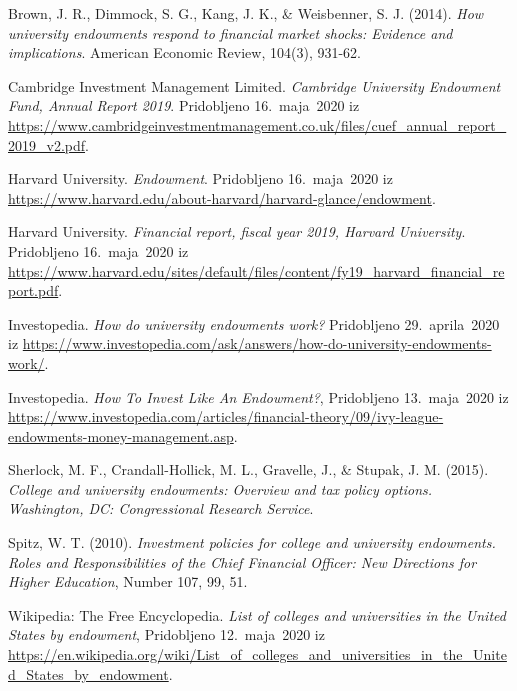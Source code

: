 \documentclass[12pt, a4paper]{article}
\begin{document}
\newpage
\begin{thebibliography}{99}

Brown, J. R., Dimmock, S. G., Kang, J. K., \& Weisbenner, S. J. (2014). \textit{How university endowments respond to financial market shocks: Evidence and implications}. American Economic Review, 104(3), 931-62.

Cambridge Investment Management Limited. \emph{Cambridge University Endowment Fund, Annual Report 2019}. Pridobljeno 16.~maja~2020 iz \url{https://www.cambridgeinvestmentmanagement.co.uk/files/cuef_annual_report_2019_v2.pdf}.

Harvard University. \emph{Endowment}. Pridobljeno 16.~maja~2020 iz \url{https://www.harvard.edu/about-harvard/harvard-glance/endowment}.

Harvard University. \emph{Financial report, fiscal year 2019, Harvard University}. Pridobljeno 16.~maja~2020 iz \url{https://www.harvard.edu/sites/default/files/content/fy19_harvard_financial_report.pdf}.

Investopedia. \emph{How do university endowments work?} Pridobljeno 29.~aprila~2020 iz \url{https://www.investopedia.com/ask/answers/how-do-university-endowments-work/}.

Investopedia. \emph{How To Invest Like An Endowment?}, Pridobljeno 13.~maja~2020 iz \url{https://www.investopedia.com/articles/financial-theory/09/ivy-league-endowments-money-management.asp}.

Sherlock, M. F., Crandall-Hollick, M. L., Gravelle, J., \& Stupak, J. M. (2015). \textit{College and university endowments: Overview and tax policy options. Washington, DC: Congressional Research Service}.

Spitz, W. T. (2010). \emph{Investment policies for college and university endowments. Roles and Responsibilities of the Chief Financial Officer: New Directions for Higher Education}, Number 107, 99, 51.

Wikipedia: The Free Encyclopedia. \emph{List of colleges and universities in the United States by endowment},  Pridobljeno 12.~maja~2020 iz \url{https://en.wikipedia.org/wiki/List_of_colleges_and_universities_in_the_United_States_by_endowment}.

\end{thebibliography}
\end{document}
